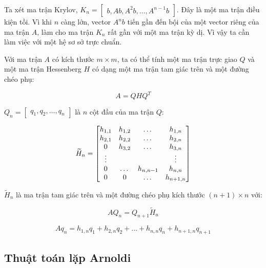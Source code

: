 \documentclass[14pt, a4paper]{article}
\numberwithin{equation}{section}
\numberwithin{algorithm}{section}
\numberwithin{figure}{section}
\numberwithin{dl}{section}
\numberwithin{md}{section}
\numberwithin{bd}{section}
\begin{document}
Ta xét ma trận Krylov, $K_n = \begin{bmatrix} b, Ab, A^2b, \dots, A^{n-1}b \end{bmatrix}$. Đây là một ma trận điều kiện tồi. Vì khi $n$ càng lớn, vector $A^nb$ tiến gần đến bội của một vector riêng của ma trận $A$, làm cho ma trận $K_n$ rất gần với một ma trận kỳ dị. Vì vậy ta cần làm việc với một hệ sơ sở trực chuẩn.

Với ma trận $A$ có kích thước $m \times m$, ta có thể tính một ma trận trực giao $Q$ và một ma trận Hessenberg $H$ có dạng một ma trận tam giác trên và một đường chéo phụ:

\begin{equation}
    A = QHQ^T
\end{equation}

$Q_n=\begin{bmatrix} q_1, q_2, \dots, q_n \end{bmatrix}$ là $n$ cột đầu của ma trận $Q$:

\begin{equation} \label{eq:Hessenberg_matrix}
    \widetilde{H}_n = \begin{bmatrix} h_{1,1} & h_{1, 2} & \dots & h_{1, n} \\
    h_{2, 1} & h_{2, 2} & \dots & h_{2, n} \\
    0 & h_{3, 2} & \dots  & h_{3, n} \\
    \vdots & \space & \space & \vdots \\
    0 & \dots & h_{n, n-1} & h_{n, n} \\
    0 & 0 & \dots & h_{n+1, n}\end{bmatrix}
\end{equation}

$\widetilde{H}_n$ là ma trận tam giác trên và một đường chéo phụ kích thước $(n+1)\times n$ với:

\begin{equation} \label{eq:A_projection}
    AQ_n = Q_{n+1}\widetilde{H}_n
\end{equation}

\begin{equation} \label{eq:recurrence_term}
    Aq_n = h_{1, n}q_1 + h_{2, n}q_2 + \dots + h_{n, n}q_n + h_{n+1, n}q_{n+1}
\end{equation}


\subsection{Thuật toán lặp Arnoldi}
\end{document}
